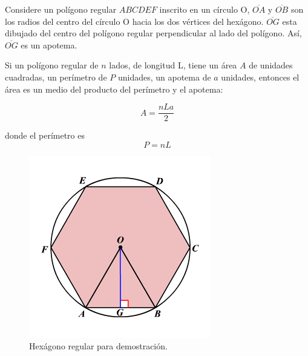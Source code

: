 \begin{tcolorbox}[
        colback=colorrds!5!white,
        colframe=colorrds!35!white,
        coltitle=black,
        fonttitle=\bfseries,
        center title,
        title=Áreas de polígonos regulares]

    \begin{minipage}{.6\textwidth}
        Considere un polígono regular $ABCDEF$ inscrito en un círculo O, $\overline{OA}$ y $\overline{OB}$  son los radios del centro del círculo O hacia los dos vértices del hexágono. $\overline{OG}$ esta dibujado del centro del polígono regular perpendicular al lado del polígono. Así, $\overline{OG}$ es un apotema.

        Si un polígono regular de $n$ lados, de longitud L, tiene un área $A$ de unidades cuadradas, un perímetro de $P$ unidades, un apotema de $a$ unidades, entonces el área es un medio del producto del perímetro y el apotema:

        \[A=\dfrac{nLa}{2}\]

        donde el perímetro es \[P=nL\]
    \end{minipage}\hfill
    \begin{minipage}{.4\textwidth}
        \begin{figure}[H]
            \centering
            \includegraphics[width=0.9\linewidth]{../images/apothem}
            \caption{Hexágono regular para demostración.}
            \label{fig:}
        \end{figure}
    \end{minipage}

\end{tcolorbox}
